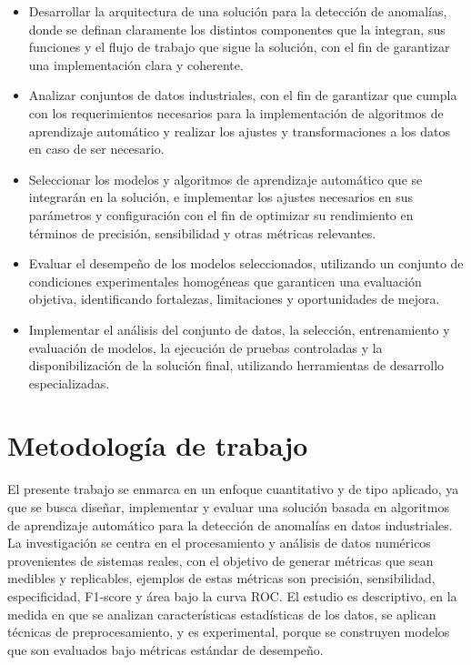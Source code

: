 \documentclass[11pt,a4paper,spanish]{book}
\numberwithin{equation}{chapter}
\numberwithin{figure}{chapter}
\begin{document}
\begin{itemize}

\item Desarrollar la arquitectura de una solución para la detección de anomalías, donde 
se definan claramente los distintos componentes que la integran, sus funciones y el 
flujo de trabajo que sigue la solución, con el fin de  garantizar una implementación 
clara y coherente.


\item Analizar conjuntos de datos industriales, con el fin de garantizar que cumpla 
con los requerimientos necesarios para la implementación de algoritmos de aprendizaje 
automático y realizar los ajustes y transformaciones a los datos en caso de ser necesario. 


\item Seleccionar los modelos y algoritmos de aprendizaje automático que se integrarán
en la solución, e implementar los ajustes necesarios en sus parámetros y configuración
con el fin de optimizar su rendimiento en términos de precisión, sensibilidad y otras
métricas relevantes.


\item Evaluar el desempeño de los modelos seleccionados, utilizando un conjunto de 
condiciones experimentales homogéneas que garanticen una evaluación objetiva, 
identificando fortalezas, limitaciones y oportunidades de mejora.


\item Implementar el análisis del conjunto de datos, la selección, entrenamiento y 
evaluación de modelos, la ejecución de pruebas controladas y la disponibilización de la 
solución final, utilizando herramientas de desarrollo especializadas. 

\end{itemize}


\chapter{Metodología de trabajo}


El presente trabajo se enmarca en un enfoque cuantitativo y de tipo aplicado, ya que se 
busca diseñar, implementar y evaluar una solución basada en algoritmos de aprendizaje 
automático para la detección de anomalías en datos industriales. La investigación se 
centra en el procesamiento y análisis de datos numéricos provenientes de sistemas reales,
con el objetivo de generar métricas que sean medibles y replicables, ejemplos de estas 
métricas son precisión, sensibilidad, especificidad, F1-score y área bajo la curva ROC.
El estudio es descriptivo, en la medida en que se analizan características estadísticas 
de los datos, se aplican técnicas de preprocesamiento, y es experimental, porque se 
construyen modelos que son evaluados bajo métricas estándar de desempeño. 
\end{document}
